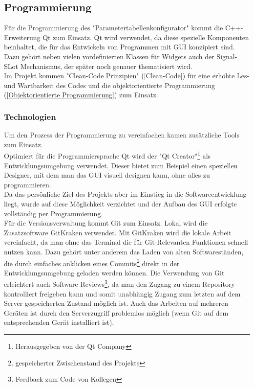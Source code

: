 \documentclass[10pt,a4paper]{article}
\begin{document}
\subsection{Programmierung}
Für die Programmierung des "Parametertabellenkonfigurator" kommt die C++-Erweiterung Qt zum Einsatz. Qt wird verwendet, da diese spezielle Komponenten beinhaltet, die für das Entwickeln von Programmen mit GUI konzipiert sind. Dazu gehört neben vielen vordefinierten Klassen für Widgets auch der Signal-SLot Mechanismus, der später noch genauer thematisiert wird.\\
Im Projekt kommen "Clean-Code Prinzipien" (\ref{Clean-Code}) für eine erhöhte Les- und Wartbarkeit des Codes und die objektorientierte Programmierung (\ref{Objektorientierte Programmierung}) zum Einsatz.
\subsubsection{Technologien} 
Um den Prozess der Programmierung zu vereinfachen kamen zusätzliche Tools zum Einsatz. \\
Optimiert für die Programmiersprache Qt wird der "Qt Creator"\footnote{Herausgegeben von der Qt Company} als Entwicklungsumgebung verwendet. Dieser bietet zum Beispiel einen speziellen Designer, mit dem man das GUI visuell designen kann, ohne alles zu programmieren. \\
Da das persönliche Ziel des Projekts aber im Einstieg in die Softwareentwicklung liegt, wurde auf diese Möglichkeit verzichtet und der Aufbau des GUI erfolgte vollständig per Programmierung. \\
Für die Versionsverwaltung kommt Git zum Einsatz. Lokal wird die Zusatzsoftware GitKraken verwendet. Mit GitKraken wird die lokale Arbeit vereinfacht, da man ohne das Terminal die für Git-Relevanten Funktionen schnell nutzen kann. Dazu gehört unter anderem das Laden von alten Softwareständen, die durch einfaches anklicken eines Commits\footnote{gespeicherter Zwischenstand des Projekts} direkt in der Entwicklungsumgebung geladen werden können. 
Die Verwendung von Git erleichtert auch Software-Reviews\footnote{Feedback zum Code von Kollegen}, da man den Zugang zu einem Repository kontrolliert freigeben kann und somit unabhängig Zugang zum letzten auf dem Server gespeicherten Zustand möglich ist. Auch das Arbeiten auf mehreren Geräten ist durch den Serverzugriff problemlos möglich (wenn Git auf dem entsprechenden Gerät installiert ist).
\end{document}
